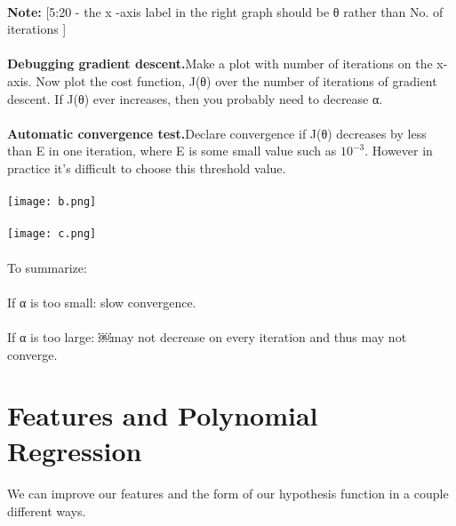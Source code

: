 \documentclass{article}
\begin{document}
\begin{CJK}{UTF8}{gbsn}
\paragraph{}
\textbf{Note:} [5:20 - the x -axis label in the right graph should be θ rather than No. of iterations ]
\paragraph{}
\textbf{Debugging gradient descent.}Make a plot with number of iterations on the x-axis. Now plot the cost function, J(θ) over the number of iterations of gradient descent. If J(θ) ever increases, then you probably need to decrease α.
\paragraph{}
\textbf{Automatic convergence test.}Declare convergence if J(θ) decreases by less than E in one iteration, where E is some small value such as $10^{-3}$. However in practice it's difficult to choose this threshold value.
\paragraph{}
\texttt{[image: b.png]}
\paragraph{}
\texttt{[image: c.png]}
\paragraph{}
To summarize:
\paragraph{}
If α is too small: slow convergence.
\paragraph{}
If α is too large: ￼may not decrease on every iteration and thus may not converge. 
\section{Features and Polynomial Regression}
\paragraph{}
We can improve our features and the form of our hypothesis function in a couple different ways.

\end{CJK}
\end{document}
